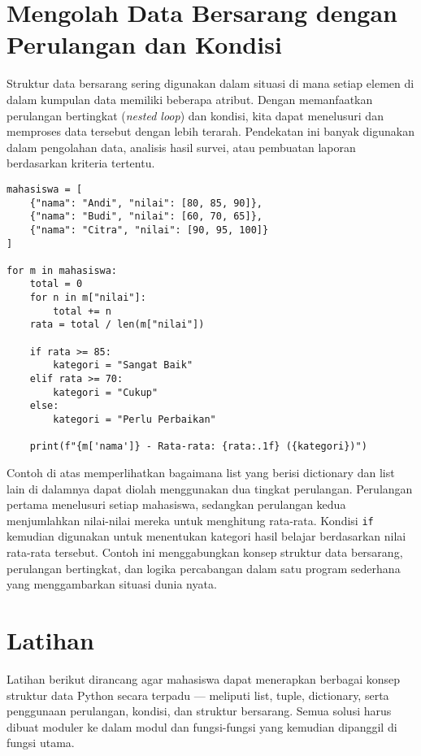 \section{Mengolah Data Bersarang dengan Perulangan dan Kondisi}
Struktur data bersarang sering digunakan dalam situasi di mana setiap elemen di dalam kumpulan data memiliki beberapa atribut. 
Dengan memanfaatkan perulangan bertingkat (\textit{nested loop}) dan kondisi, kita dapat menelusuri dan memproses data tersebut dengan lebih terarah. 
Pendekatan ini banyak digunakan dalam pengolahan data, analisis hasil survei, atau pembuatan laporan berdasarkan kriteria tertentu.

\begin{lstlisting}[style=PythonStyle]
mahasiswa = [
    {"nama": "Andi", "nilai": [80, 85, 90]},
    {"nama": "Budi", "nilai": [60, 70, 65]},
    {"nama": "Citra", "nilai": [90, 95, 100]}
]

for m in mahasiswa:
    total = 0
    for n in m["nilai"]:
        total += n
    rata = total / len(m["nilai"])
    
    if rata >= 85:
        kategori = "Sangat Baik"
    elif rata >= 70:
        kategori = "Cukup"
    else:
        kategori = "Perlu Perbaikan"
    
    print(f"{m['nama']} - Rata-rata: {rata:.1f} ({kategori})")
\end{lstlisting}

Contoh di atas memperlihatkan bagaimana list yang berisi dictionary dan list lain di dalamnya dapat diolah menggunakan dua tingkat perulangan. 
Perulangan pertama menelusuri setiap mahasiswa, sedangkan perulangan kedua menjumlahkan nilai-nilai mereka untuk menghitung rata-rata. 
Kondisi \texttt{if} kemudian digunakan untuk menentukan kategori hasil belajar berdasarkan nilai rata-rata tersebut. 
Contoh ini menggabungkan konsep struktur data bersarang, perulangan bertingkat, dan logika percabangan dalam satu program sederhana yang menggambarkan situasi dunia nyata.

\section{Latihan}
Latihan berikut dirancang agar mahasiswa dapat menerapkan berbagai konsep struktur data Python 
secara terpadu — meliputi list, tuple, dictionary, serta penggunaan perulangan, kondisi, dan struktur bersarang. Semua solusi harus dibuat moduler ke dalam modul dan fungsi-fungsi yang kemudian dipanggil di fungsi utama. 

